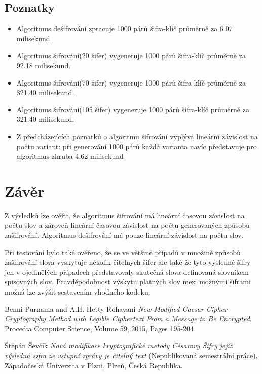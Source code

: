 \documentclass[12pt,a4paper]{article}
\let\oldsection\section
\renewcommand\section{\clearpage\oldsection}
\begin{document}
\subsection{Poznatky}
\begin{itemize}
\setlength\itemsep{0.0em}
\item Algoritmus dešifrování zpracuje 1000 párů šifra-klíč průměrně za 6.07 milisekund.
\item Algoritmus šifrování(20 šifer) vygeneruje 1000 párů šifra-klíč průměrně za 92.18 milisekund.
\item Algoritmus šifrování(70 šifer) vygeneruje 1000 párů šifra-klíč průměrně za 321.40 milisekund.
\item Algoritmus šifrování(105 šifer) vygeneruje 1000 párů šifra-klíč průměrně za 321.40 milisekund.
\item Z předcházejících poznatků o algoritmu šifrování vyplývá lineární závislost na počtu variant: při generování 1000 párů každá varianta navíc představuje pro algoritmus zhruba 4.62 milisekund
\end{itemize}


\section{Závěr}
Z výsledků lze ověřit, že algoritmus šifrování má lineární časovou závislost na počtu slov a zároveň lineární časovou závislost na počtu generovaných způsobů zašifrování. Algoritmus dešifrování má pouze lineární závislost na počtu slov.

Při testování bylo také ověřeno, že se ve většině případů v množině způsobů zašifrování slova vyskytuje několik čitelných šifer ale také že tyto výsledné šifry jen v ojedinělých případech představovaly skutečná slova definovaná slovníkem spisovných slov.
Pravděpodobnost výskytu platných slov mezi možnými šiframi možná lze zvýšit sestavením vhodného kodeku.
\begin{thebibliography}{9}

Benni Purnama and A.H. Hetty Rohayani
\textit{New Modified Caesar Cipher Cryptography Method with Legible Ciphertext From a Message to Be Encrypted}. 
Procedia Computer Science, Volume 59, 2015, Pages 195-204

Štěpán Ševčík
\textit{Nová modifikace kryptografické metody Césarovy Šifry
jejíž výsledná šifra ze vstupní zprávy je čitelný text} (Nepublikovaná semestrální práce).
Západočeská Univerzita v Plzni, Plzeň, Česká Republika.
 
\end{thebibliography}

\end{document}

